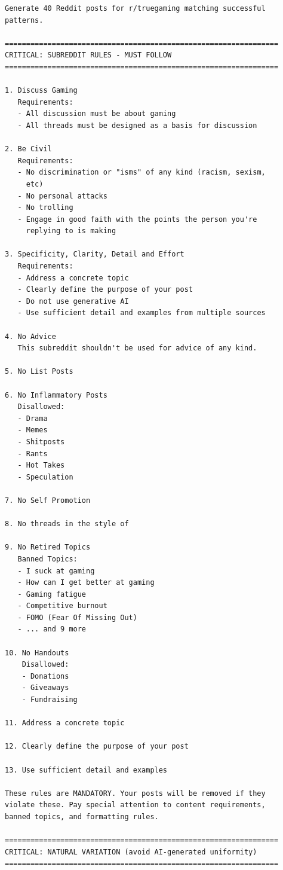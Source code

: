 \begin{small}
\begin{verbatim}
Generate 40 Reddit posts for r/truegaming matching successful 
patterns.

================================================================
CRITICAL: SUBREDDIT RULES - MUST FOLLOW
================================================================

1. Discuss Gaming
   Requirements:
   - All discussion must be about gaming
   - All threads must be designed as a basis for discussion

2. Be Civil
   Requirements:
   - No discrimination or "isms" of any kind (racism, sexism, 
     etc)
   - No personal attacks
   - No trolling
   - Engage in good faith with the points the person you're 
     replying to is making

3. Specificity, Clarity, Detail and Effort
   Requirements:
   - Address a concrete topic
   - Clearly define the purpose of your post
   - Do not use generative AI
   - Use sufficient detail and examples from multiple sources

4. No Advice
   This subreddit shouldn't be used for advice of any kind.

5. No List Posts

6. No Inflammatory Posts
   Disallowed:
   - Drama
   - Memes
   - Shitposts
   - Rants
   - Hot Takes
   - Speculation

7. No Self Promotion

8. No threads in the style of

9. No Retired Topics
   Banned Topics:
   - I suck at gaming
   - How can I get better at gaming
   - Gaming fatigue
   - Competitive burnout
   - FOMO (Fear Of Missing Out)
   - ... and 9 more

10. No Handouts
    Disallowed:
    - Donations
    - Giveaways
    - Fundraising

11. Address a concrete topic

12. Clearly define the purpose of your post

13. Use sufficient detail and examples

These rules are MANDATORY. Your posts will be removed if they 
violate these. Pay special attention to content requirements, 
banned topics, and formatting rules.

================================================================
CRITICAL: NATURAL VARIATION (avoid AI-generated uniformity)
================================================================


\end{verbatim}
\end{small}
